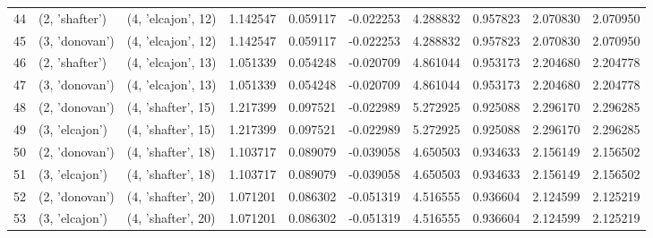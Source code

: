 \begin{tabular}{lllrrrrrrr}
44 &   (2, 'shafter') &  (4, 'elcajon', 12) &  1.142547 &   0.059117 & -0.022253 &   4.288832 &  0.957823 &   2.070830 &  2.070950 \\
45 &   (3, 'donovan') &  (4, 'elcajon', 12) &  1.142547 &   0.059117 & -0.022253 &   4.288832 &  0.957823 &   2.070830 &  2.070950 \\
46 &   (2, 'shafter') &  (4, 'elcajon', 13) &  1.051339 &   0.054248 & -0.020709 &   4.861044 &  0.953173 &   2.204680 &  2.204778 \\
47 &   (3, 'donovan') &  (4, 'elcajon', 13) &  1.051339 &   0.054248 & -0.020709 &   4.861044 &  0.953173 &   2.204680 &  2.204778 \\
48 &   (2, 'donovan') &  (4, 'shafter', 15) &  1.217399 &   0.097521 & -0.022989 &   5.272925 &  0.925088 &   2.296170 &  2.296285 \\
49 &   (3, 'elcajon') &  (4, 'shafter', 15) &  1.217399 &   0.097521 & -0.022989 &   5.272925 &  0.925088 &   2.296170 &  2.296285 \\
50 &   (2, 'donovan') &  (4, 'shafter', 18) &  1.103717 &   0.089079 & -0.039058 &   4.650503 &  0.934633 &   2.156149 &  2.156502 \\
51 &   (3, 'elcajon') &  (4, 'shafter', 18) &  1.103717 &   0.089079 & -0.039058 &   4.650503 &  0.934633 &   2.156149 &  2.156502 \\
52 &   (2, 'donovan') &  (4, 'shafter', 20) &  1.071201 &   0.086302 & -0.051319 &   4.516555 &  0.936604 &   2.124599 &  2.125219 \\
53 &   (3, 'elcajon') &  (4, 'shafter', 20) &  1.071201 &   0.086302 & -0.051319 &   4.516555 &  0.936604 &   2.124599 &  2.125219 \\
\bottomrule
\end{tabular}
